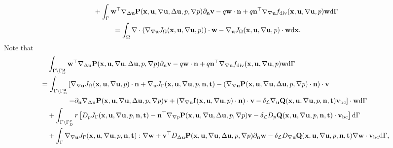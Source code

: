 \documentclass[oneside,11pt]{book}
\numberwithin{equation}{section}
\begin{document}
\begin{align*}
    &+ \int_\Gamma {\bf w}^\top\nabla_{\Delta{\bf u}}{\bf P}({\bf x},{\bf u},\nabla{\bf u},\Delta{\bf u},p,\nabla p)\partial_{\bf n}{\bf v} - q{\bf w}\cdot{\bf n} + q{\bf n}^\top\nabla_{\nabla{\bf u}}f_{\rm div}({\bf x},{\bf u},\nabla{\bf u},p){\bf w}{\rm d}\Gamma\\
    &\hspace{1cm} = \int_\Omega \nabla\cdot\left(\nabla_{\nabla{\bf u}}J_\Omega({\bf x},{\bf u},\nabla{\bf u},p)\right)\cdot{\bf w} - \nabla_{\bf u}J_\Omega({\bf x},{\bf u},\nabla{\bf u},p)\cdot{\bf w}{\rm d}{\bf x}.
\end{align*}
Note that
\begin{align*}
    &\int_{\Gamma\backslash\Gamma_{\rm D}^{\bf u}} {\bf w}^\top\nabla_{\Delta{\bf u}}{\bf P}({\bf x},{\bf u},\nabla{\bf u},\Delta{\bf u},p,\nabla p)\partial_{\bf n}{\bf v} - q{\bf w}\cdot{\bf n} + q{\bf n}^\top\nabla_{\nabla{\bf u}}f_{\rm div}({\bf x},{\bf u},\nabla{\bf u},p){\bf w}{\rm d}\Gamma\\
    =&\, \int_{\Gamma\backslash\Gamma_{\rm D}^{\bf u}} \left[\nabla_{\nabla{\bf u}}J_\Omega({\bf x},{\bf u},\nabla{\bf u},p)\cdot{\bf n} + \nabla_{\bf u}J_\Gamma({\bf x},{\bf u},\nabla{\bf u},p,{\bf n},{\bf t}) - \left(\nabla_{\nabla{\bf u}}{\bf P}({\bf x},{\bf u},\nabla{\bf u},\Delta{\bf u},p,\nabla p)\cdot{\bf n}\right)\cdot{\bf v}\right.\\
    &\hspace{1cm} \left.- \partial_{\bf n}\nabla_{\Delta{\bf u}}{\bf P}({\bf x},{\bf u},\nabla{\bf u},\Delta{\bf u},p,\nabla p){\bf v} + \left(\nabla_{\nabla{\bf u}}{\bf f}({\bf x},{\bf u},\nabla{\bf u},p)\cdot{\bf n}\right)\cdot{\bf v} - \delta_{\mathcal{L}}\nabla_{\bf u}{\bf Q}({\bf x},{\bf u},\nabla{\bf u},p,{\bf n},{\bf t}){\bf v}_{\rm bc}\right]\cdot{\bf w}{\rm d}\Gamma\\
    &+ \int_{\Gamma\backslash\Gamma_{\rm D}^p} r\left[D_pJ_\Gamma({\bf x},{\bf u},\nabla{\bf u},p,{\bf n},{\bf t}) - {\bf n}^\top\nabla_{\nabla p}{\bf P}({\bf x},{\bf u},\nabla{\bf u},\Delta{\bf u},p,\nabla p){\bf v} - \delta_{\mathcal{L}}D_p{\bf Q}({\bf x},{\bf u},\nabla{\bf u},p,{\bf n},{\bf t})\cdot{\bf v}_{\rm bc}\right]{\rm d}\Gamma\\
    &+ \int_\Gamma \nabla_{\nabla{\bf u}}J_\Gamma({\bf x},{\bf u},\nabla{\bf u},p,{\bf n},{\bf t}):\nabla{\bf w} + {\bf v}^\top D_{\Delta{\bf u}}{\bf P}({\bf x},{\bf u},\nabla{\bf u},\Delta{\bf u},p,\nabla p)\partial_{\bf n}{\bf w} - \delta_{\mathcal{L}}D_{\nabla{\bf u}}{\bf Q}({\bf x},{\bf u},\nabla{\bf u},p,{\bf n},{\bf t})\nabla{\bf w}\cdot{\bf v}_{\rm bc}{\rm d}\Gamma,
\end{align*}
\end{document}
